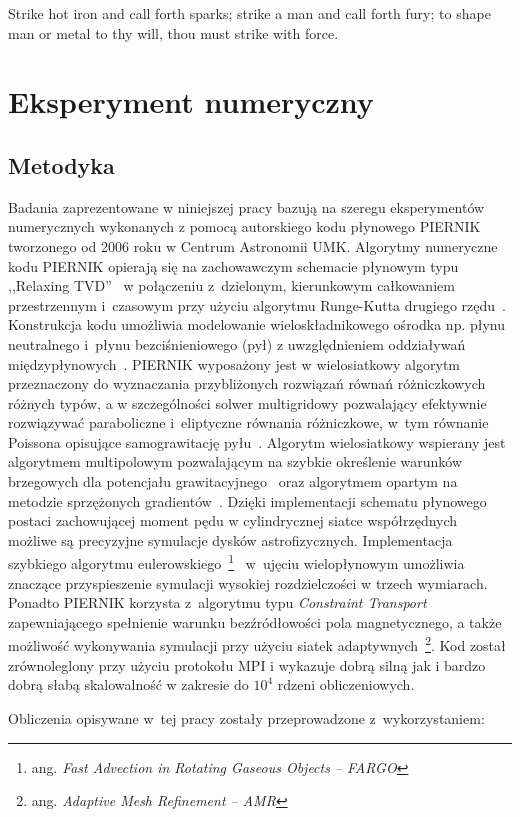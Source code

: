 \begin{savequote}[75mm]
Strike hot iron and call forth sparks; strike a man and call forth fury; to shape man or metal to thy will, thou must
strike with force.
\end{savequote}

\chapter{Eksperyment numeryczny}
\section{Metodyka}
\label{sec:metodyka}
Badania zaprezentowane w niniejszej pracy bazują na szeregu eksperymentów
numerycznych wykonanych z pomocą autorskiego kodu płynowego PIERNIK tworzonego
od 2006 roku w Centrum Astronomii UMK.  Algorytmy numeryczne kodu PIERNIK
opierają się na zachowawczym schemacie płynowym typu ,,Relaxing
TVD''~\cite{jin-xin-95} w połączeniu z~dzielonym, kierunkowym całkowaniem
przestrzennym i~czasowym przy użyciu algorytmu Runge-Kutta drugiego
rzędu~\cite{2003PASP..115..303T,2003ApJS..149..447P}. Konstrukcja kodu umożliwia
modelowanie wieloskładnikowego ośrodka np. płynu neutralnego i~płynu
bezciśnieniowego (pył) z uwzględnieniem oddziaływań
międzypłynowych~\cite{piernik1,piernik2}. PIERNIK wyposażony jest w
wielosiatkowy algorytm przeznaczony do wyznaczania przybliżonych rozwiązań
równań różniczkowych różnych typów, a w szczególności
solwer multigridowy pozwalający efektywnie rozwiązywać paraboliczne
i~eli\-pty\-czne równania różniczkowe, w~tym równanie Poissona opisujące
samograwitację pyłu~\citep{HG00}. Algorytm wielosiatkowy wspierany jest
algorytmem multipolowym pozwalającym na szybkie określenie warunków brzegowych
dla potencjału grawitacyjnego~\citep{J77} oraz algorytmem opartym na metodzie
sprzężonych gradientów~\cite{pcg}. Dzięki implementacji schematu płynowego
postaci zachowującej moment pędu w cylindrycznej siatce
współrzędnych~\cite{M07,SO10} możliwe są  precyzyjne  symulacje dysków
astrofizycznych. Implementacja szybkiego algorytmu eulerowskiego~\footnote{ang.
\emph{Fast Advection in Rotating Gaseous Objects -- FARGO}}~\citep{M00} w~ujęciu
wielopłynowym umożliwia znaczące przyspieszenie  symulacji wysokiej
rozdzielczości w trzech wymiarach.  Ponadto PIERNIK korzysta z~algorytmu typu
\emph{Constraint Transport}~\cite{EH88} zapewniającego spełnienie warunku
bezźródłowości pola magnetycznego, a także możliwość wykonywania symulacji przy
użyciu siatek adaptywnych~\footnote{ang.  \emph{Adaptive Mesh Refinement --
AMR}}. Kod został zrównoleglony przy użyciu protokołu MPI i wykazuje dobrą silną
jak i bardzo dobrą słabą skalowalność w zakresie do $10^4$ rdzeni
obliczeniowych.
%
\par Obliczenia opisywane w~tej pracy zostały przeprowadzone z~wykorzystaniem:


